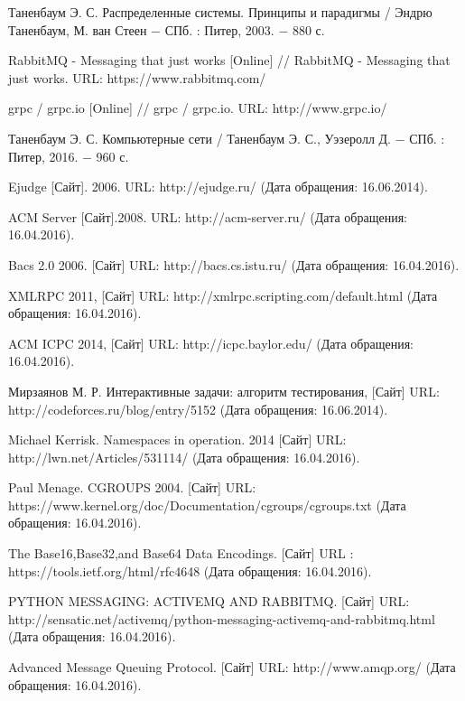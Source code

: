\begin{thebibliography}{9}

Таненбаум Э. С. Распределенные системы. Принципы и парадигмы / Эндрю Таненбаум, М. ван Стеен − СПб. : Питер, 2003. − 880 с.

RabbitMQ - Messaging that just works [Online] // RabbitMQ - Messaging that just works. URL: https://www.rabbitmq.com/

grpc / grpc.io [Online] // grpc / grpc.io. URL: http://www.grpc.io/

Таненбаум Э. С. Компьютерные сети / Таненбаум Э. С., Уэзеролл Д. − СПб. : Питер, 2016. − 960 с.

Ejudge [Сайт]. 2006. URL: http://ejudge.ru/ (Дата обращения: 16.06.2014).

ACM Server [Сайт].2008. URL: http://acm-server.ru/ (Дата обращения: 16.04.2016).

Bacs 2.0 2006. [Сайт] URL: http://bacs.cs.istu.ru/ (Дата обращения: 16.04.2016).

XMLRPC 2011, [Сайт] URL: http://xmlrpc.scripting.com/default.html (Дата обращения: 16.04.2016).

ACM ICPC 2014, [Сайт] URL: http://icpc.baylor.edu/ (Дата обращения: 16.04.2016).

Мирзаянов М. Р. Интерактивные задачи: алгоритм тестирования, [Сайт] URL: http://codeforces.ru/blog/entry/5152 (Дата обращения: 16.06.2014).

Michael Kerrisk. Namespaces in operation. 2014 [Сайт] URL: http://lwn.net/Articles/531114/ (Дата обращения: 16.04.2016).

Paul Menage. CGROUPS 2004. [Сайт] URL: https://www.kernel.org/doc/Documentation/cgroups/cgroups.txt (Дата обращения: 16.04.2016).

The Base16,Base32,and Base64 Data Encodings. [Сайт] URL : https://tools.ietf.org/html/rfc4648 (Дата обращения: 16.04.2016).

PYTHON MESSAGING: ACTIVEMQ AND RABBITMQ. [Сайт] URL: http://sensatic.net/activemq/python-messaging-activemq-and-rabbitmq.html (Дата обращения: 16.04.2016).

Advanced Message Queuing Protocol. [Сайт] URL: http://www.amqp.org/  (Дата обращения: 16.04.2016).

\end{thebibliography}
